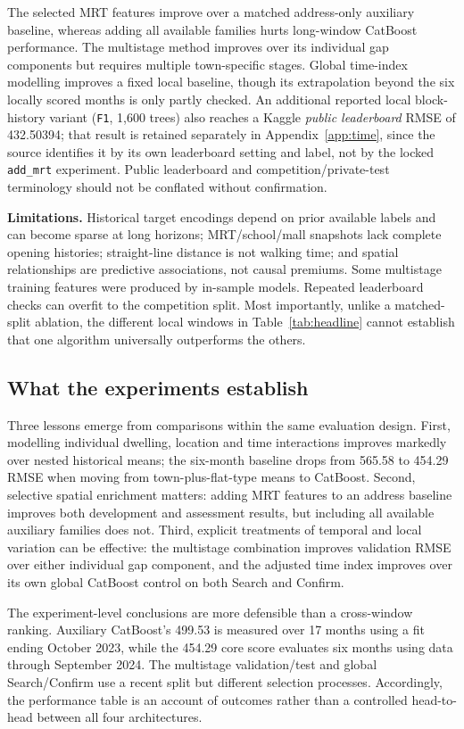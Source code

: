 \documentclass[10pt,a4paper]{article}
\begin{document}
The selected MRT features improve over a matched address-only auxiliary baseline, whereas adding all available families hurts long-window CatBoost performance. The multistage method improves over its individual gap components but requires multiple town-specific stages. Global time-index modelling improves a fixed local baseline, though its extrapolation beyond the six locally scored months is only partly checked. An additional reported local block-history variant (\texttt{F1}, 1,600 trees) also reaches a Kaggle \emph{public leaderboard} RMSE of 432.50394; that result is retained separately in Appendix~\ref{app:time}, since the source identifies it by its own leaderboard setting and label, not by the locked \texttt{add\_mrt} experiment. Public leaderboard and competition/private-test terminology should not be conflated without confirmation.

\textbf{Limitations.} Historical target encodings depend on prior available labels and can become sparse at long horizons; MRT/school/mall snapshots lack complete opening histories; straight-line distance is not walking time; and spatial relationships are predictive associations, not causal premiums. Some multistage training features were produced by in-sample models. Repeated leaderboard checks can overfit to the competition split. Most importantly, unlike a matched-split ablation, the different local windows in Table~\ref{tab:headline} cannot establish that one algorithm universally outperforms the others.


\subsection{What the experiments establish}
Three lessons emerge from comparisons within the same evaluation design. First, modelling individual dwelling, location and time interactions improves markedly over nested historical means; the six-month baseline drops from 565.58 to 454.29 RMSE when moving from town-plus-flat-type means to CatBoost. Second, selective spatial enrichment matters: adding MRT features to an address baseline improves both development and assessment results, but including all available auxiliary families does not. Third, explicit treatments of temporal and local variation can be effective: the multistage combination improves validation RMSE over either individual gap component, and the adjusted time index improves over its own global CatBoost control on both Search and Confirm.

The experiment-level conclusions are more defensible than a cross-window ranking. Auxiliary CatBoost's 499.53 is measured over 17 months using a fit ending October 2023, while the 454.29 core score evaluates six months using data through September 2024. The multistage validation/test and global Search/Confirm use a recent split but different selection processes. Accordingly, the performance table is an account of outcomes rather than a controlled head-to-head between all four architectures.
\end{document}
